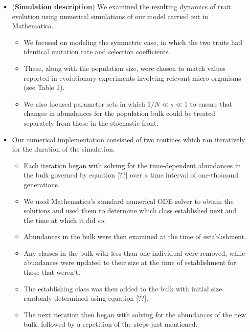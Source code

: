 \documentclass[11pt,one column]{article}
\begin{document}
\begin{itemize}
\item (\textbf{Simulation description}) We examined the resulting dynamics of trait evolution using numerical simulations of our model carried out in Mathematica.
\begin{itemize}
\item We focused on modeling the symmetric case, in which the two traits had identical mutation rate and selection coefficients.
\item These, along with the population size, were chosen to match values reported in evolutionary experiments involving relevant micro-organisms (see Table 1).  
\item We also focused parameter sets in which $1/N \ll s \ll 1$ to ensure that changes in abundances for the population bulk could be treated separately from those in the stochastic front.
\end{itemize}

\item Our numerical implementation consisted of two routines which ran iteratively for the duration of the simulation.
\begin{itemize}
\item Each iteration began with solving for the time-dependent abundances in the bulk governed by equation [??] over a time interval of one-thousand generations.
\item We used Mathematica's standard numerical ODE solver to obtain the solutions and used them to determine which class established next and the time at which it did so.
\item Abundances in the bulk were then examined at the time of establishment.
\item Any classes in the bulk with less than one individual were removed, while abundances were updated to their size at the time of establishment for those that weren't.
\item The establishing class was then added to the bulk with initial size randomly determined using equation [??].
\item The next iteration then began with solving for the abundances of the new bulk, followed by a repetition of the steps just mentioned.  
\end{itemize}	


\end{itemize}
\end{document}
